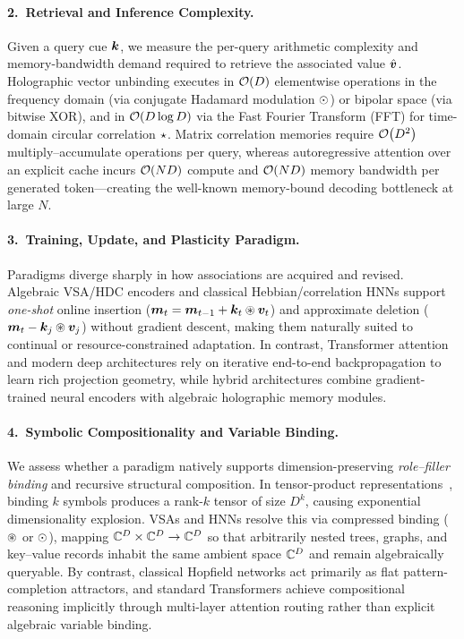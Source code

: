 \paragraph{2.\ Retrieval and Inference Complexity.}
Given a query cue $\boldsymbol{k}$, we measure the per-query arithmetic complexity and memory-bandwidth demand required to retrieve the associated value $\hat{\boldsymbol{v}}$.
Holographic vector unbinding executes in $\mathcal{O}\!\left(D\right)$ elementwise operations in the frequency domain (via conjugate Hadamard modulation $\odot$) or bipolar space (via bitwise XOR), and in $\mathcal{O}\!\left(D \log D\right)$ via the Fast Fourier Transform (FFT) for time-domain circular correlation $\star$.
Matrix correlation memories require $\mathcal{O}\!\left(D^2\right)$ multiply--accumulate operations per query, whereas autoregressive attention over an explicit cache incurs $\mathcal{O}\!\left(ND\right)$ compute and $\mathcal{O}\!\left(ND\right)$ memory bandwidth per generated token---creating the well-known memory-bound decoding bottleneck at large $N$.

\paragraph{3.\ Training, Update, and Plasticity Paradigm.}
Paradigms diverge sharply in how associations are acquired and revised.
Algebraic VSA/HDC encoders and classical Hebbian/correlation HNNs support \emph{one-shot} online insertion ($\boldsymbol{m}_{t} = \boldsymbol{m}_{t-1} + \boldsymbol{k}_t \circledast \boldsymbol{v}_t$) and approximate deletion ($\boldsymbol{m}_{t} - \boldsymbol{k}_j \circledast \boldsymbol{v}_j$) without gradient descent, making them naturally suited to continual or resource-constrained adaptation.
In contrast, Transformer attention and modern deep architectures rely on iterative end-to-end backpropagation to learn rich projection geometry, while hybrid architectures combine gradient-trained neural encoders with algebraic holographic memory modules.

\paragraph{4.\ Symbolic Compositionality and Variable Binding.}
We assess whether a paradigm natively supports dimension-preserving \emph{role--filler binding} and recursive structural composition.
In tensor-product representations~\cite{SMOLENSKY_1990_TPR}, binding $k$ symbols produces a rank-$k$ tensor of size $D^k$, causing exponential dimensionality explosion.
VSAs and HNNs resolve this via compressed binding ($\circledast$ or $\odot$), mapping $\mathbb{C}^D \times \mathbb{C}^D \to \mathbb{C}^D$ so that arbitrarily nested trees, graphs, and key--value records inhabit the same ambient space $\mathbb{C}^D$ and remain algebraically queryable.
By contrast, classical Hopfield networks act primarily as flat pattern-completion attractors, and standard Transformers achieve compositional reasoning implicitly through multi-layer attention routing rather than explicit algebraic variable binding.

